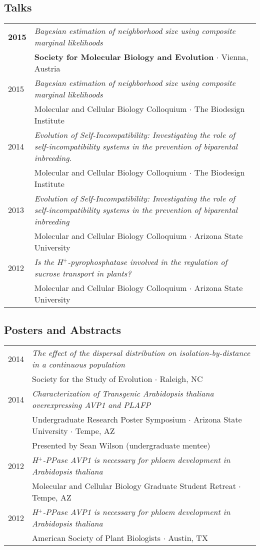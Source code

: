 \documentclass[11pt]{article}
\begin{document}
\subsection*{Talks}
\renewcommand{\arraystretch}{1}
\begin{tabularx}{\linewidth}{l X}
\textbf{2015}&\textit{Bayesian estimation of neighborhood size using composite marginal likelihoods}\\
&\textbf{Society for Molecular Biology and Evolution} $\cdotp$ Vienna, Austria\\
2015&\textit{Bayesian estimation of neighborhood size using composite marginal likelihoods}\\
&Molecular and Cellular Biology Colloquium $\cdot$ The Biodesign Institute\\
2014&\textit{Evolution of Self-Incompatibility: Investigating the role of self-incompatibility systems in the prevention of biparental inbreeding.}\\
&Molecular and Cellular Biology Colloquium $\cdotp$ The Biodesign Institute\\
2013&\textit{Evolution of Self-Incompatibility: Investigating the role of self-incompatibility systems in the prevention of biparental inbreeding}\\
&Molecular and Cellular Biology Colloquium $\cdotp$ Arizona State University\\
2012&\textit{Is the H$^+$-pyrophosphatase involved in the regulation of sucrose transport in plants?}\\
&Molecular and Cellular Biology Colloquium $\cdotp$ Arizona State University\\
\end{tabularx}
\subsection*{Posters and Abstracts}
\begin{tabularx}{\linewidth}{l X}
2014&\textit{The effect of the dispersal distribution on isolation-by-distance in a continuous population}\\
&Society for the Study of Evolution $\cdotp$ Raleigh, NC\\
2014&\textit{Characterization of Transgenic Arabidopsis thaliana overexpressing AVP1 and PLAFP}\\
&Undergraduate Research Poster Symposium $\cdotp$ Arizona State University $\cdotp$ Tempe, AZ\\
&Presented by Sean Wilson (undergraduate mentee)\\
2012&\textit{H$^+$-PPase AVP1 is necessary for phloem development in Arabidopsis thaliana}\\
&Molecular and Cellular Biology Graduate Student Retreat $\cdotp$ Tempe, AZ\\
2012&\textit{H$^+$-PPase AVP1 is necessary for phloem development in Arabidopsis thaliana}\\
&American Society of Plant Biologists $\cdotp$ Austin, TX\\
\end{tabularx}
\end{document}
